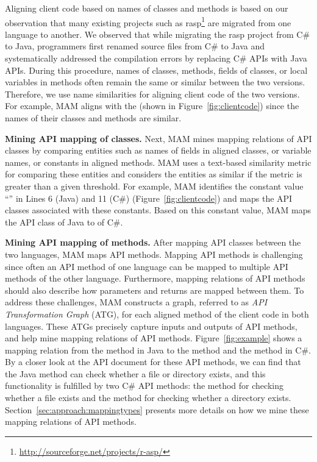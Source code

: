 Aligning client code based on names of classes and methods is based
on our observation that many existing projects such as
rasp\footnote{\url{http://sourceforge.net/projects/r-asp/}} are
migrated from one language to another. We observed that while
migrating the rasp project from C\# to Java, programmers first
renamed source files from C\# to Java and systematically addressed
the compilation errors by replacing C\# APIs with Java APIs. During
this procedure, names of classes, methods, fields of classes, or
local variables in methods often remain the same or similar between
the two versions. Therefore, we use name similarities for aligning
client code of the two versions. For example, MAM aligns
 with the  (shown in
Figure~\ref{fig:clientcode}) since the names of their classes and
methods are similar.

\textbf{Mining API mapping of classes.} Next, MAM mines mapping
relations of API classes by comparing entities such as names of
fields in aligned classes, or variable names, or constants in aligned
methods. MAM uses a text-based similarity metric for comparing these
entities and considers the entities as similar if the metric is
greater than a given threshold. For
example, MAM identifies the constant value ``'' in
Lines 6 (Java) and 11 (C\#) (Figure~\ref{fig:clientcode}) and maps
the API classes associated with these constants. Based on this
constant value, MAM maps the API class  of Java
to  of C\#.

\textbf{Mining API mapping of methods.} After mapping API classes
between the two languages, MAM maps API methods. Mapping API methods
is challenging since often an API method of one language can be
mapped to multiple API methods of the other language. Furthermore,
mapping relations of API methods should also describe how parameters
and returns are mapped between them. To address these challenges,
MAM constructs a graph, referred to as \emph{API Transformation
Graph} (ATG), for each aligned method of the client code in both
languages. These ATGs precisely capture inputs and outputs of API
methods, and help mine mapping relations of API methods.
Figure~\ref{fig:example} shows a mapping relation from the  method in Java to the  method and the  method in C\#. By a closer look at the API document for these API methods, we can find that the Java method can check whether a file or directory exists, and this functionality is fulfilled by two C\# API methods: the  method for checking whether a file exists and the  method for checking whether a directory exists. Section~\ref{sec:approach:mappingtypes} presents more details on how
we mine these mapping relations of API methods.

